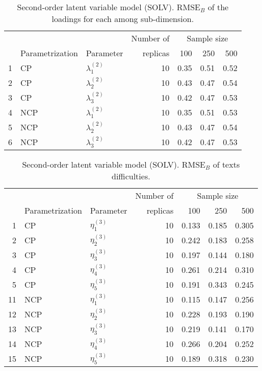 \begin{table}[H]
	\centering
	\begin{tabular}{rllrrrr}
		\hline
		\multicolumn{3}{c}{ } & Number of &\multicolumn{3}{c}{ Sample size } \\ 
		\cmidrule(rl){5-7}
		& Parametrization  & Parameter & replicas & 100 & 250 & 500 \\  
		\hline\hline
		1 & CP & $\lambda^{(2)}_{1}$ &  10 & 0.35 & 0.51 & 0.52 \\ 
		2 & CP & $\lambda^{(2)}_{2}$ &  10 & 0.43 & 0.47 & 0.54 \\ 
		3 & CP & $\lambda^{(2)}_{3}$ &  10 & 0.42 & 0.47 & 0.53 \\ 
		\hline
		4 & NCP & $\lambda^{(2)}_{1}$ &  10 & 0.35 & 0.51 & 0.53 \\ 
		5 & NCP & $\lambda^{(2)}_{2}$ &  10 & 0.43 & 0.47 & 0.54 \\ 
		6 & NCP & $\lambda^{(2)}_{3}$ &  10 & 0.42 & 0.47 & 0.53 \\ 
		\hline
	\end{tabular}
	\caption[Second-order latent variable model (SOLV). $\text{RMSE}_{B}$ of the loadings for each sub-dimension.]%
	{Second-order latent variable model (SOLV). $\text{RMSE}_{B}$ of the loadings for each among sub-dimension.}
	\label{tab:SOLV_RMSE_loads}
\end{table}
%
\begin{table}[H]
	\centering
	\begin{tabular}{rllrrrr}
		\hline
		\multicolumn{3}{c}{ } & Number of &\multicolumn{3}{c}{ Sample size } \\ 
		\cmidrule(rl){5-7}
		& Parametrization & Parameter & replicas & 100 & 250 & 500 \\  
		\hline\hline
		1 & CP & $\eta^{(3)}_{1}$ &   10 & 0.133 & 0.185 & 0.305 \\ 
		2 & CP & $\eta^{(3)}_{2}$ &   10 & 0.242 & 0.183 & 0.258 \\ 
		3 & CP & $\eta^{(3)}_{3}$ &   10 & 0.197 & 0.144 & 0.180 \\ 
		4 & CP & $\eta^{(3)}_{4}$ &   10 & 0.261 & 0.214 & 0.310 \\ 
		5 & CP & $\eta^{(3)}_{5}$ &   10 & 0.191 & 0.343 & 0.245 \\ 
		\hline
		11 & NCP & $\eta^{(3)}_{1}$ &  10 & 0.115 & 0.147 & 0.256 \\ 
		12 & NCP & $\eta^{(3)}_{2}$ &   10 & 0.228 & 0.193 & 0.190 \\ 
		13 & NCP & $\eta^{(3)}_{3}$ &   10 & 0.219 & 0.141 & 0.170 \\ 
		14 & NCP & $\eta^{(3)}_{4}$ &   10 & 0.266 & 0.204 & 0.252 \\ 
		15 & NCP & $\eta^{(3)}_{5}$ &   10 & 0.189 & 0.318 & 0.230 \\ 
		\hline
	\end{tabular}
	\caption[Second-order latent variable model (SOLV). $\text{RMSE}_{B}$ of texts difficulties.]%
	{Second-order latent variable model (SOLV). $\text{RMSE}_{B}$ of texts difficulties.}
	\label{tab:SOLV_RMSE_texts_diff}
\end{table}

